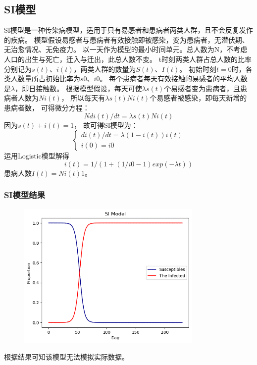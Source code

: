 \documentclass{article}
\begin{document}
\subsection*{SI模型}
SI模型是一种传染病模型，适用于只有易感者和患病者两类人群，且不会反复发作的疾病。
模型假设易感者与患病者有效接触即被感染，变为患病者，无潜伏期、无治愈情况、无免疫力。
以一天作为模型的最小时间单元。总人数为N，不考虑人口的出生与死亡，迁入与迁出，此总人数不变。
t时刻两类人群占总人数的比率分别记为$s(t)$、$i(t)$，两类人群的数量为$S(t)$、$I(t)$。
初始时刻$t=0$时，各类人数量所占初始比率为$s0$、$i0$。
每个患病者每天有效接触的易感者的平均人数是$\lambda$，即日接触数。
根据模型假设，每天可使$\lambda s(t)$个易感者变为患病者，且患病者人数为$Ni(t)$，
所以每天有$\lambda s(t)Ni(t)$个易感者被感染，即每天新增的患病者数，
可得微分方程：$$Ndi(t)/dt=\lambda s(t)Ni(t)$$因为$s(t)+i(t)=1$，
故可得SI模型为：$$\begin{cases}
    di(t)/dt=\lambda (1-i(t))i(t)\\
    i(0)=i0
\end{cases}$$
运用Logistic模型解得$$i(t)=1/(1+(1/i0-1)exp(-\lambda t))$$
患病人数$I(t)=Ni(t)1$。

\subsubsection*{SI模型结果}
\begin{figure}[htbp]
    \centering
	\includegraphics[width=0.8\textwidth]{./img/1.png}
    \caption*{}

\end{figure}

根据结果可知该模型无法模拟实际数据。
\end{document}
